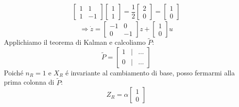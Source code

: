 \documentclass[../main.tex]{subfiles}
\begin{document}
\begin{mdframed}[style=Exercise]
\begin{Exercise}[title={Calcolo di $ X_R $ e decomposizione di raggiungibilit\'a}, difficulty=1]
\begin{align*}
					\begin{bmatrix}
						1 & 1\\
						1 & -1
					\end{bmatrix}
					\begin{bmatrix}
						1\\
						1
					\end{bmatrix} = \dfrac{1}{2}
					\begin{bmatrix}
						2\\
						0
					\end{bmatrix}=
					\begin{bmatrix}
						1\\
						0
					\end{bmatrix}
				\end{align*}
				\[
					\Rightarrow \dot z=
					\begin{bmatrix}
						-1 & 0\\
						0 & -1
					\end{bmatrix} z +
					\begin{bmatrix}
						1\\
						0
					\end{bmatrix} u
				\]
				Applichiamo il teorema di Kalman e calcoliamo $ \tilde P $:
				\[
					\tilde P =
					\begin{bmatrix}
						1 & | & \dots\\
						0 & | & \dots
					\end{bmatrix}
				\]
				Poich\'e $ n_R = 1 $ e $ X_R $ \'e invariante al cambiamento di base, posso fermarmi alla prima colonna di $ \tilde P $:
				\[
					Z_R = \alpha
					\begin{bmatrix}
						1\\
						0
					\end{bmatrix}
				\]
			\end{Exercise}
		\end{mdframed}
	
\end{document}

